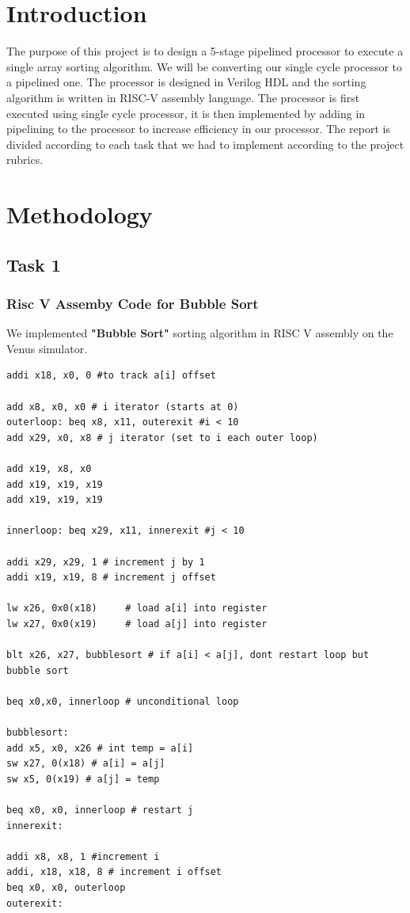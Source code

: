 \documentclass{article}
\begin{document}
\section{Introduction}
\hspace{1cm} The purpose of this project is to design a 5-stage pipelined processor to execute a single array sorting algorithm. We will be converting our single cycle
processor to a pipelined one. The processor is designed in Verilog HDL and
the sorting algorithm is written in RISC-V assembly language. The processor
is first executed using single cycle processor, it is then implemented by adding
in pipelining to the processor to increase efficiency in our processor. The report
is divided according to each task that we had to implement according to the
project rubrics.

\section{Methodology}
\subsection{Task 1}
\subsubsection{Risc V Assemby Code for Bubble Sort}
\hspace{1cm} We implemented \textbf{"Bubble Sort"} sorting algorithm in RISC V assembly on the Venus simulator.  
\begin{lstlisting}[caption={Selection Sort Assembly code}, captionpos=b, language=RISC-V]
addi x18, x0, 0 #to track a[i] offset

add x8, x0, x0 # i iterator (starts at 0)
outerloop: beq x8, x11, outerexit #i < 10
add x29, x0, x8 # j iterator (set to i each outer loop)

add x19, x8, x0
add x19, x19, x19
add x19, x19, x19

innerloop: beq x29, x11, innerexit #j < 10

addi x29, x29, 1 # increment j by 1
addi x19, x19, 8 # increment j offset

lw x26, 0x0(x18)     # load a[i] into register
lw x27, 0x0(x19)     # load a[j] into register

blt x26, x27, bubblesort # if a[i] < a[j], dont restart loop but bubble sort

beq x0,x0, innerloop # unconditional loop

bubblesort: 
add x5, x0, x26 # int temp = a[i]
sw x27, 0(x18) # a[i] = a[j]
sw x5, 0(x19) # a[j] = temp

beq x0, x0, innerloop # restart j
innerexit:

addi x8, x8, 1 #increment i
addi, x18, x18, 8 # increment i offset
beq x0, x0, outerloop
outerexit:
    

\end{lstlisting}
\end{document}
